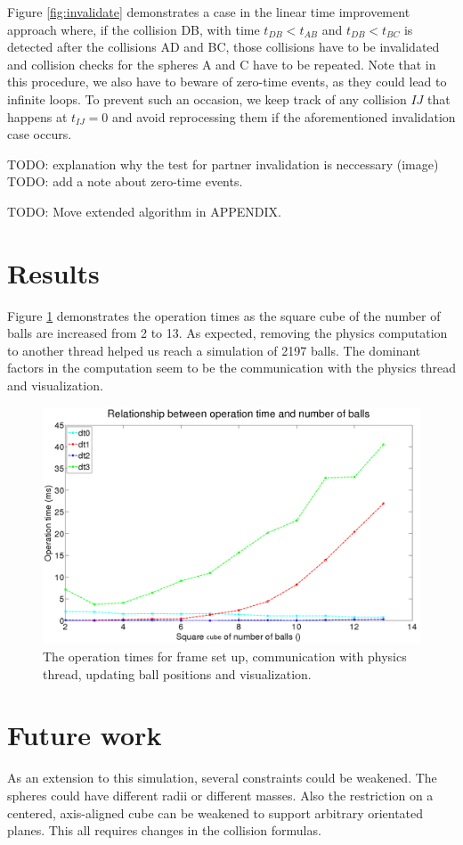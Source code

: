\documentclass[journal, letterpaper]{IEEEtran}
\begin{document}
Figure \ref{fig:invalidate} demonstrates a case in the linear time improvement approach where, if
the collision DB, with time $t_{DB} < t_{AB}$ and $t_{DB} < t_{BC}$ is detected after the collisions
AD and BC, those collisions have to be invalidated and collision checks for the spheres A and C have 
to be repeated. Note that in this procedure, we also have to beware of zero-time events, as they could
lead to infinite loops. To prevent such an occasion, we keep track of any collision $IJ$ that happens at $t_{IJ} = 0$
and avoid reprocessing them if the aforementioned invalidation case occurs. 
  
TODO: explanation why the test for partner invalidation is neccessary (image)
TODO: add a note about zero-time events.

TODO: Move extended algorithm in APPENDIX.

\section{Results}

Figure \ref{fig:results} demonstrates the operation times as the square cube of the number of balls are increased from 2 to 13. 
As expected, removing the physics computation to another thread helped us reach a simulation of 2197 balls. The dominant
factors in the computation seem to be the communication with the physics thread and visualization.

\begin{figure}[ht!] 
  \centering
  \includegraphics[width=1.0\linewidth]{results.png}
  \caption{The operation times for frame set up, communication with physics thread, updating ball positions and visualization.}
  \label{fig:results}
\end{figure}

\section{Future work}
As an extension to this simulation, several constraints could be weakened. The spheres could have different radii or different masses. Also the restriction on a centered, axis-aligned cube can be weakened to support arbitrary orientated planes. This all requires changes in the collision formulas.
\end{document}
